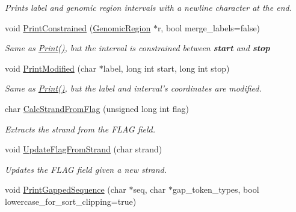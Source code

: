 \begin{DoxyCompactItemize}
\begin{DoxyCompactList}\small\item\em Prints label and genomic region intervals with a newline character at the end. \end{DoxyCompactList}\item 
\hypertarget{classGenomicRegionSAM_adf8beab78f541121e7b56957afffa4ac}{
void \hyperlink{classGenomicRegionSAM_adf8beab78f541121e7b56957afffa4ac}{PrintConstrained} (\hyperlink{classGenomicRegion}{GenomicRegion} $\ast$r, bool merge\_\-labels=false)}
\label{classGenomicRegionSAM_adf8beab78f541121e7b56957afffa4ac}

\begin{DoxyCompactList}\small\item\em Same as \hyperlink{classGenomicRegionSAM_a4381c6486f767b6e4055cb729beee181}{Print()}, but the interval is constrained between {\bfseries start} and {\bfseries stop} \end{DoxyCompactList}\item 
\hypertarget{classGenomicRegionSAM_aecf1d74c572e85bbe9bca0b30c6a6dda}{
void \hyperlink{classGenomicRegionSAM_aecf1d74c572e85bbe9bca0b30c6a6dda}{PrintModified} (char $\ast$label, long int start, long int stop)}
\label{classGenomicRegionSAM_aecf1d74c572e85bbe9bca0b30c6a6dda}

\begin{DoxyCompactList}\small\item\em Same as \hyperlink{classGenomicRegionSAM_a4381c6486f767b6e4055cb729beee181}{Print()}, but the label and interval's coordinates are modified. \end{DoxyCompactList}\item 
\hypertarget{classGenomicRegionSAM_a6d0949a836520073de57e0f968a6b819}{
char \hyperlink{classGenomicRegionSAM_a6d0949a836520073de57e0f968a6b819}{CalcStrandFromFlag} (unsigned long int flag)}
\label{classGenomicRegionSAM_a6d0949a836520073de57e0f968a6b819}

\begin{DoxyCompactList}\small\item\em Extracts the strand from the FLAG field. \end{DoxyCompactList}\item 
\hypertarget{classGenomicRegionSAM_af583a963f7fb0eb071c1b640c660813a}{
void \hyperlink{classGenomicRegionSAM_af583a963f7fb0eb071c1b640c660813a}{UpdateFlagFromStrand} (char strand)}
\label{classGenomicRegionSAM_af583a963f7fb0eb071c1b640c660813a}

\begin{DoxyCompactList}\small\item\em Updates the FLAG field given a new strand. \end{DoxyCompactList}\item 
\hypertarget{classGenomicRegionSAM_aea563a4a484784ad231399a3b56c7056}{
void \hyperlink{classGenomicRegionSAM_aea563a4a484784ad231399a3b56c7056}{PrintGappedSequence} (char $\ast$seq, char $\ast$gap\_\-token\_\-types, bool lowercase\_\-for\_\-sort\_\-clipping=true)}
\label{classGenomicRegionSAM_aea563a4a484784ad231399a3b56c7056}


\end{DoxyCompactItemize}
